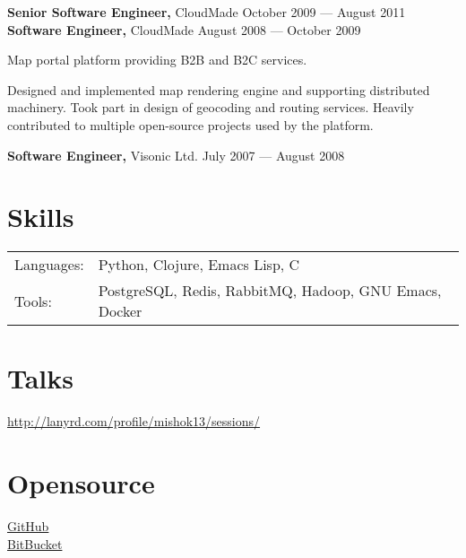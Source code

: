\documentclass[margin]{res}
\begin{document}
\begin{resume}
{\bf Senior Software Engineer,} CloudMade \hfill October 2009 --- August 2011\\
{\bf Software Engineer,} CloudMade \hfill August 2008 --- October 2009

Map portal platform providing B2B and B2C services.

Designed and implemented map rendering engine and supporting
distributed machinery. Took part in design of geocoding and routing
services. Heavily contributed to multiple open-source projects used by
the platform.

{\bf Software Engineer,} Visonic Ltd. \hfill July 2007 --- August 2008





\section{Skills}
\begin{tabular}{l p{5in}}
  Languages: & Python, Clojure, Emacs Lisp, C \\
  Tools: & PostgreSQL, Redis, RabbitMQ, Hadoop, GNU Emacs, Docker \\
\end{tabular}

\section{Talks}

\href{http://lanyrd.com/profile/mishok13/sessions/}{http://lanyrd.com/profile/mishok13/sessions/}

\section{Opensource}

\href{https://github.com/mishok13}{GitHub}\\
\href{https://bitbucket.org/mishok13}{BitBucket}

\end{resume}
\end{document}
